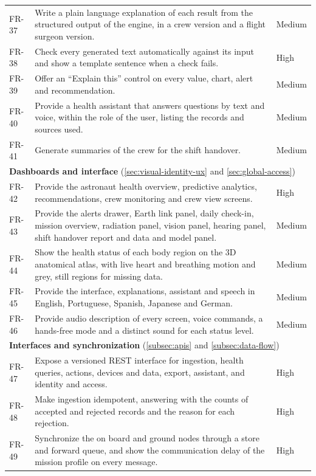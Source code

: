 {\begin{longtable}{p{1.5cm}p{10.8cm}p{1.5cm}}
FR-37 & Write a plain language explanation of each result from the structured output of the engine, in a crew version and a flight surgeon version. & Medium \\
FR-38 & Check every generated text automatically against its input and show a template sentence when a check fails. & High \\
FR-39 & Offer an ``Explain this'' control on every value, chart, alert and recommendation. & Medium \\
FR-40 & Provide a health assistant that answers questions by text and voice, within the role of the user, listing the records and sources used. & Medium \\
FR-41 & Generate summaries of the crew for the shift handover. & Medium \\
\multicolumn{3}{l}{\textbf{Dashboards and interface} (\ref{sec:visual-identity-ux} and \ref{sec:global-access})} \\
FR-42 & Provide the astronaut health overview, predictive analytics, recommendations, crew monitoring and crew view screens. & High \\
FR-43 & Provide the alerts drawer, Earth link panel, daily check-in, mission overview, radiation panel, vision panel, hearing panel, shift handover report and data and model panel. & Medium \\
FR-44 & Show the health status of each body region on the 3D anatomical atlas, with live heart and breathing motion and grey, still regions for missing data. & Medium \\
FR-45 & Provide the interface, explanations, assistant and speech in English, Portuguese, Spanish, Japanese and German. & Medium \\
FR-46 & Provide audio description of every screen, voice commands, a hands-free mode and a distinct sound for each status level. & Medium \\
\multicolumn{3}{l}{\textbf{Interfaces and synchronization} (\ref{subsec:apis} and \ref{subsec:data-flow})} \\
FR-47 & Expose a versioned REST interface for ingestion, health queries, actions, devices and data, export, assistant, and identity and access. & High \\
FR-48 & Make ingestion idempotent, answering with the counts of accepted and rejected records and the reason for each rejection. & High \\
FR-49 & Synchronize the on board and ground nodes through a store and forward queue, and show the communication delay of the mission profile on every message. & High \\

\end{longtable}}
